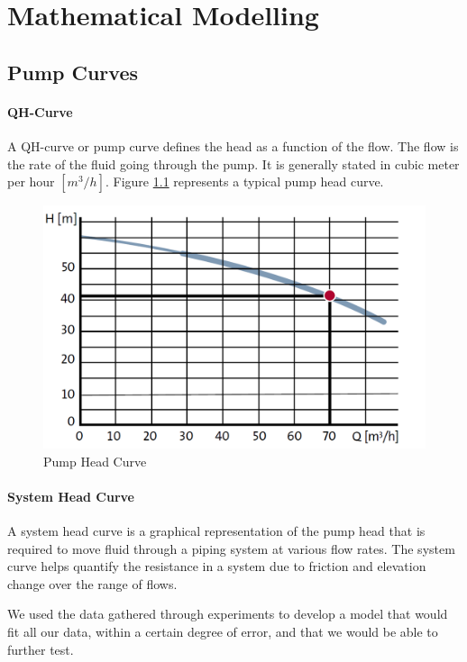 \chapter{Mathematical Modelling}\label{ch:mathmodel}

\section{Pump Curves}\label{sec:pumpcurves}
\subsubsection{QH-Curve}

A QH-curve or pump curve defines the head as a function of the flow. The flow is the rate of the fluid going through the 
pump. It is generally stated in cubic meter per hour $[m^{3}/h]$. Figure \ref{fig:pump_head_curve} represents a typical pump head curve.

\begin{figure}[h]
	\centering
	\includegraphics[width = 0.8\linewidth]{figures/pump_head_curve.PNG}
	\caption{Pump Head Curve}
	\label{fig:pump_head_curve}
\end{figure}

\newpage
\subsubsection{System Head Curve}
A system head curve is a graphical representation of the pump head that is required to move fluid through a piping system at various flow rates.
The system curve helps quantify the resistance in a system due to friction and elevation change over the range of flows. 


We used the data gathered through experiments to develop a model that would fit all our data, within a certain degree of error, 
and that we would be able to further test.

